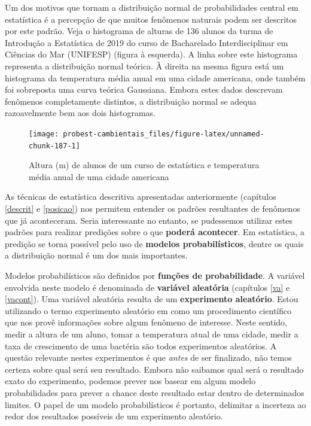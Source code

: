 \documentclass[
]{book}
\begin{document}
Um dos motivos que tornam a distribuição normal de probabilidades central em estatística é a percepção de que muitos fenômenos naturais podem ser descritos por este padrão. Veja o histograma de alturas de 136 alunos da turma de Introdução a Estatística de 2019 do curso de Bacharelado Interdisciplinar em Ciências do Mar (UNIFESP) (figura à esquerda). A linha sobre este histograma representa a distribuição normal teórica. À direita na mesma figura está um histograma da temperatura média anual em uma cidade americana, onde também foi sobreposta uma curva teórica Gaussiana. Embora estes dados descrevam fenômenos completamente distintos, a distribuição normal se adequa razoavelmente bem aos dois histogramas.

\begin{figure}

{\centering \texttt{[image: probest-cambientais\_files/figure-latex/unnamed-chunk-187-1]} 

}

\caption{Altura (m) de alunos de um curso de estatística e temperatura média anual de uma cidade americana}\label{fig:unnamed-chunk-187}
\end{figure}

As técnicas de estatística descritiva apresentadas anteriormente (capítulos \ref{descrit} e \ref{posicao}) nos permitem entender os padrões resultantes de fenômenos que já aconteceram. Seria interessante no entanto, se pudessemos utilizar estes padrões para realizar predições sobre o que \textbf{poderá acontecer}. Em estatística, a predição se torna possível pelo uso de \textbf{modelos probabilísticos}, dentre os quais a distribuição normal é um dos mais importantes.

Modelos probabilísticos são definidos por \textbf{funções de probabilidade}. A variável envolvida neste modelo é denominada de \textbf{variável aleatória} (capítulos \ref{va} e \ref{vacont}). Uma variável aleatória resulta de um \textbf{experimento aleatório}. Estou utilizando o termo experimento aleatório em como um procedimento científico que nos provê informações sobre algum fenômeno de interesse. Neste sentido, medir a altura de um aluno, tomar a temperatura atual de uma cidade, medir a taxa de crescimento de uma bactéria são todos experimentos aleatórios. A questão relevante nestes experimentos é que \emph{antes} de ser finalizado, não temos certeza sobre qual será seu resultado. Embora não saibamos qual será o resultado exato do experimento, podemos prever nos basear em algum modelo probabilidades para prever a chance deste resultado estar dentro de determinados limites. O papel de um modelo probabilísticos é portanto, delimitar a incerteza ao redor dos resultados possíveis de um experimento aleatório.
\end{document}
